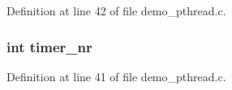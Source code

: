 Definition at line 42 of file demo\_\-pthread.c.
\subsubsection[{timer\_\-nr}]{\setlength{\rightskip}{0pt plus 5cm}int {\bf timer\_\-nr}}\label{demo__pthread_8c_a08acd51f63cf91bc834e8b83041998dd}


Definition at line 41 of file demo\_\-pthread.c.